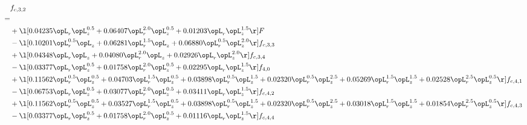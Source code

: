 \begin{alignat}{2} 
\label{eq:f_32_2} 
& f_{c,3,2} \nonumber \\ 
 = \\ 
& + \l[  0.04235 \opL_r \opL_z^{0.5} +  0.06407 \opL_r^{2.0} \opL_z^{0.5} +  0.01203 \opL_r \opL_z^{1.5}  \r] F \nonumber \\ 
& - \l[  0.10201 \opL_r^{0.5} \opL_z +  0.06281 \opL_r^{1.5} \opL_z +  0.06880 \opL_r^{0.5} \opL_z^{2.0}  \r] f_{c,3,3} \nonumber \\ 
& + \l[  0.04348 \opL_r \opL_z +  0.04080 \opL_r^{2.0} \opL_z +  0.02926 \opL_r \opL_z^{2.0}  \r] f_{c,3,4} \nonumber \\ 
& - \l[  0.03377 \opL_r \opL_z^{0.5} +  0.01758 \opL_r^{2.0} \opL_z^{0.5} +  0.02295 \opL_r \opL_z^{1.5}  \r] f_{4,0} \nonumber \\ 
& + \l[  0.11562 \opL_r^{0.5} \opL_z^{0.5} +  0.04703 \opL_r^{1.5} \opL_z^{0.5} +  0.03898 \opL_r^{0.5} \opL_z^{1.5} +  0.02320 \opL_r^{0.5} \opL_z^{2.5} +  0.05269 \opL_r^{1.5} \opL_z^{1.5} +  0.02528 \opL_r^{2.5} \opL_z^{0.5}  \r] f_{c,4,1} \nonumber \\ 
& - \l[  0.06753 \opL_r \opL_z^{0.5} +  0.03077 \opL_r^{2.0} \opL_z^{0.5} +  0.03411 \opL_r \opL_z^{1.5}  \r] f_{c,4,2} \nonumber \\ 
& + \l[  0.11562 \opL_r^{0.5} \opL_z^{0.5} +  0.03527 \opL_r^{1.5} \opL_z^{0.5} +  0.03898 \opL_r^{0.5} \opL_z^{1.5} +  0.02320 \opL_r^{0.5} \opL_z^{2.5} +  0.03018 \opL_r^{1.5} \opL_z^{1.5} +  0.01854 \opL_r^{2.5} \opL_z^{0.5}  \r] f_{c,4,3} \nonumber \\ 
& - \l[  0.03377 \opL_r \opL_z^{0.5} +  0.01758 \opL_r^{2.0} \opL_z^{0.5} +  0.01116 \opL_r \opL_z^{1.5}  \r] f_{c,4,4} \nonumber \\ 
\end{alignat} 



